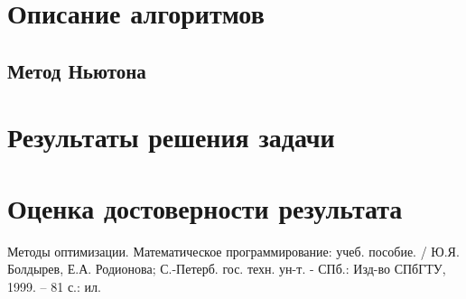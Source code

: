 \documentclass[main.tex]{subfiles}
\begin{document}
\section{Описание алгоритмов}

\subsection{Метод Ньютона}

\section{Результаты решения задачи}
\section{Оценка достоверности результата}

\begin{thebibliography}{99}
	 Методы оптимизации. Математическое программирование: учеб. пособие. / Ю.Я. Болдырев, Е.А. Родионова; С.-Петерб. гос. техн. ун-т. - СПб.: Изд-во СПбГТУ, 1999. -- 81 с.: ил.
\end{thebibliography}
\end{document}
